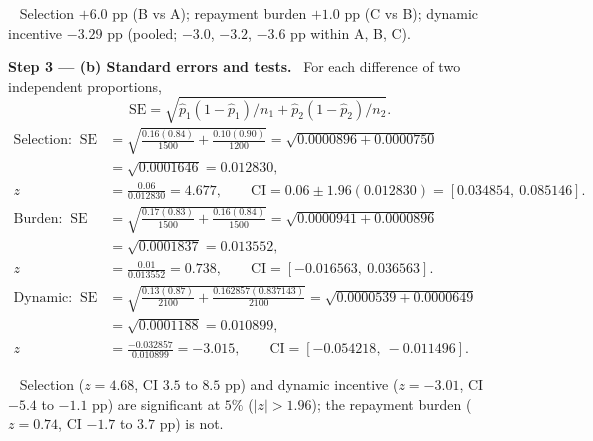 \documentclass[11pt,a4paper]{article}
\newcommand{\step}[2]{\par\medskip\noindent\textbf{Step #1 --- #2.}~}
\newcommand{\answer}[1]{\par\smallskip\noindent\fbox{\textbf{Answer #1.}}~}
\begin{document}
\answer{(a)} Selection $+6.0$ pp (B vs A); repayment burden $+1.0$ pp (C vs B); dynamic incentive $-3.29$ pp
(pooled; $-3.0$, $-3.2$, $-3.6$ pp within A, B, C).

\step{3}{(b) Standard errors and tests} For each difference of two independent proportions,
$$\text{SE}=\sqrt{\hat p_1(1-\hat p_1)/n_1+\hat p_2(1-\hat p_2)/n_2}.$$
\begin{align}
  \text{Selection: }\ \text{SE} &= \sqrt{\frac{0.16(0.84)}{1500}+\frac{0.10(0.90)}{1200}} = \sqrt{0.0000896+0.0000750} \nonumber\\
  &= \sqrt{0.0001646} = 0.012830, \nonumber\\
  z &= \frac{0.06}{0.012830} = 4.677,\qquad \text{CI} = 0.06\pm1.96(0.012830) = [0.034854,\ 0.085146]. \nonumber\\
  \text{Burden: }\ \text{SE} &= \sqrt{\frac{0.17(0.83)}{1500}+\frac{0.16(0.84)}{1500}} = \sqrt{0.0000941+0.0000896} \nonumber\\
  &= \sqrt{0.0001837} = 0.013552, \nonumber\\
  z &= \frac{0.01}{0.013552} = 0.738,\qquad \text{CI} = [-0.016563,\ 0.036563]. \nonumber\\
  \text{Dynamic: }\ \text{SE} &= \sqrt{\frac{0.13(0.87)}{2100}+\frac{0.162857(0.837143)}{2100}} = \sqrt{0.0000539+0.0000649} \nonumber\\
  &= \sqrt{0.0001188} = 0.010899, \nonumber\\
  z &= \frac{-0.032857}{0.010899} = -3.015,\qquad \text{CI} = [-0.054218,\ -0.011496]. \nonumber
\end{align}

\answer{(b)} Selection ($z=4.68$, CI $3.5$ to $8.5$ pp) and dynamic incentive ($z=-3.01$, CI $-5.4$ to $-1.1$ pp) are
significant at $5\%$ ($|z|>1.96$); the repayment burden ($z=0.74$, CI $-1.7$ to $3.7$ pp) is not.
\end{document}
